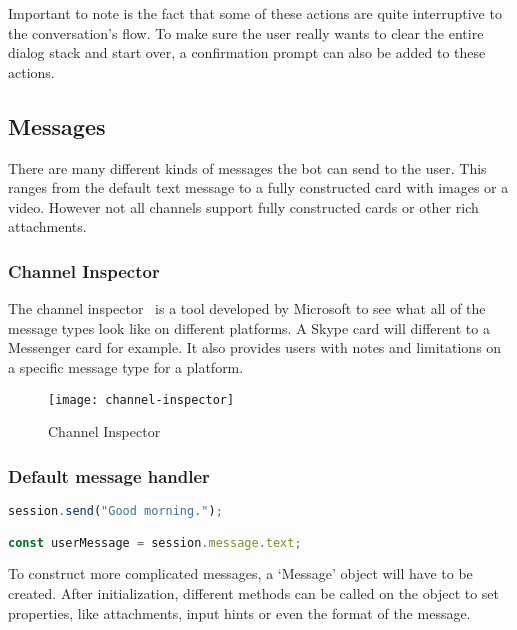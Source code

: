 Important to note is the fact that some of these actions are quite interruptive to the conversation's flow. To make sure the user really wants to clear the entire dialog stack and start over, a confirmation prompt can also be added to these actions.

\subsection{Messages}

There are many different kinds of messages the bot can send to the user. This ranges from the default text message to a fully constructed card with images or a video. However not all channels support fully constructed cards or other rich attachments.

\subsubsection{Channel Inspector}

The channel inspector~\cite{channel-inspector} is a tool developed by Microsoft to see what all of the message types look like on different platforms. A Skype card will different to a Messenger card for example. It also provides users with notes and limitations on a specific message type for a platform.

\begin{figure}[ht]
	\centering
	\texttt{[image: channel-inspector]}
	\caption{Channel Inspector~\cite{channel-inspector}}
	\label{fig:channel-inspector}
\end{figure}

\subsubsection{Default message handler}

\begin{lstlisting}[language=JavaScript,caption=Sending a simple text message or reading the message from the user is very easy,label=listing:send-text-message]
session.send("Good morning.");

const userMessage = session.message.text;
\end{lstlisting}

To construct more complicated messages, a `Message' object will have to be created. After initialization, different methods can be called on the object to set properties, like attachments, input hints or even the format of the message.

